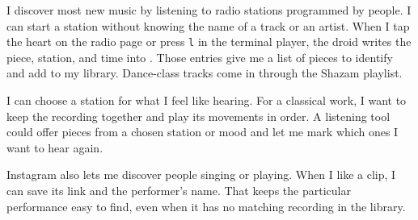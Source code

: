 \documentclass[11pt,a4paper]{article}
\begin{document}
I discover most new music by listening to radio stations programmed by people. I can start a station without knowing the name of a track or an artist. When I tap the heart on the radio page or press \texttt{l} in the terminal player, the droid writes the piece, station, and time into . Those entries give me a list of pieces to identify and add to my library. Dance-class tracks come in through the Shazam playlist.

I can choose a station for what I feel like hearing. For a classical work, I want to keep the recording together and play its movements in order. A listening tool could offer pieces from a chosen station or mood and let me mark which ones I want to hear again.

Instagram also lets me discover people singing or playing. When I like a clip, I can save its link and the performer's name. That keeps the particular performance easy to find, even when it has no matching recording in the library.
\end{document}
